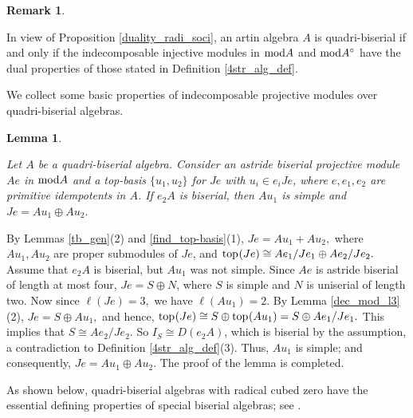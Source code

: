 \documentclass[10pt]{amsart}
\newtheorem{Lemma}[Theo]{Lemma}
\theoremstyle{definition}
\newtheorem{Remark}[Theo]{Remark}
\newcommand{\mmod}{{\rm mod}}
\newcommand{\ntop}{{\rm top}\hspace{.5pt}}
\begin{document}
\begin{Remark} \label{4sa_rem} 

In view of Proposition \ref{duality_radi_soci}, an artin algebra $A$ is quadri-biserial if and only if the indecomposable injective modules in $\mmod A$ and $\mmod A^\circ$ have the dual properties of those stated in Definition \ref{4str_alg_def}.

\end{Remark}

\smallskip

We collect some basic properties of indecomposable projective modules over quadri-biserial algebras.

\smallskip

\begin{Lemma}\label{4sa_bproj}

Let $A$ be a quadri-biserial algebra. Consider an astride biserial projective module $Ae$ in $\mmod A$ and a top-basis $\{u_1, u_2\}$ for $Je$ with $u_i\in e_iJe$, where $e, e_1, e_2$ are primitive idempotents in $A$. If $e_2A$ is biserial, then $Au_1$ is simple and $Je=Au_1\oplus Au_2.$ 

\end{Lemma}

\vspace{-1.5pt}

 By Lemmas \ref{tb_gen}(2) and \ref{find_top-basis}(1), $Je=Au_1+Au_2,$ where $Au_1, Au_2$ are proper submodules of $Je$, and $\ntop(Je)\cong Ae_1/Je_1\oplus Ae_2/Je_2.$ Assume that $e_2A$ is biserial, but $Au_1$ was not simple. Since $Ae$ is astride biserial of length at most four, $Je=S\oplus N$, where $S$ is simple and $N$ is uniserial of length two. Now since $\ell(Je)=3,$ we have $\ell(Au_1)=2.$ By Lemma \ref{dec_mod_l3}(2), $Je=S\oplus Au_1,$ and hence, $\ntop(Je)\cong S\oplus \ntop(Au_1) = S\oplus Ae_1/Je_1.$ This implies that $S\cong Ae_2/Je_2$. So $I_S\cong D(e_2A)$, which is biserial by the assumption, a contradiction to Definition \ref{4str_alg_def}(3). Thus, $Au_1$ is simple; and consequently, $Je=Au_1\oplus Au_2.$ The proof of the lemma is completed.

\smallskip

As shown below, quadri-biserial algebras with radical cubed zero have the essential defining properties of special biserial algebras; see \cite[Section 1]{SKW}.
\end{document}
